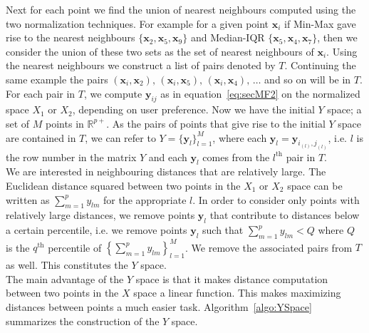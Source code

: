 \documentclass[11pt]{article}
\begin{document}
Next for each point we find the union of nearest neighbours computed using the two normalization techniques. For example for a given point $\bm{x}_i$ if Min-Max gave rise to the nearest neighbours $\{\bm{x}_2, \bm{x}_5, \bm{x}_9 \}$ and Median-IQR   $\{\bm{x}_5, \bm{x}_4, \bm{x}_7 \}$, then we consider the union of these two sets as the set of nearest neighbours of $\bm{x}_i$. Using the nearest neighbours we construct a list of pairs denoted by $T$. Continuing the same example the pairs $(\bm{x}_i, \bm{x}_2), \,  (\bm{x}_i, \bm{x}_5), \, (\bm{x}_i, \bm{x}_4), \, \ldots $ and so on will be in $T$. \\

For each pair in $T$, we compute $\bm{y}_{ij}$ as in equation~\eqref{eq:secMF2} on the normalized space $X_1$ or $X_2$, depending on user preference. Now we have the initial $Y$ space; a set of $M$ points in $\mathbb{R}^{p+}$. As the pairs of points that give rise to the initial $Y$ space are contained in $T$, we can refer to $Y = \{ \bm{y}_l \}_{l=1}^M$, where each $\bm{y}_l = \bm{y}_{i_{(l)}, j_{(l)} }$, i.e. $l$ is the row number in the matrix $Y$ and each $\bm{y}_l$ comes from the $l^{\text{th}}$ pair in $T$. \\

We are interested in neighbouring distances that are relatively large. The Euclidean distance squared between two points in the $X_1$ or $X_2$ space  can be written as $\sum_{m=1}^p y_{lm}$ for the appropriate $l$. In order to consider only points with relatively large distances, we remove points $\bm{y}_l$ that contribute to distances below a certain percentile, i.e. we remove points $\bm{y}_l$ such that  $\sum_{m=1}^p y_{lm} < Q$ where $Q$ is the $q^{\text{th}}$ percentile of $ \left \{\sum_{m=1}^p y_{lm} \right \}_{l=1}^M$. We remove the associated pairs from $T$ as well. This constitutes the $Y$ space. \\

The main advantage of the $Y$ space is that it makes distance computation  between two points in the $X$ space a linear function. This makes maximizing distances between points a much easier task. 
Algorithm~\ref{algo:YSpace} summarizes the construction of the $Y$ space. 

\end{document}
